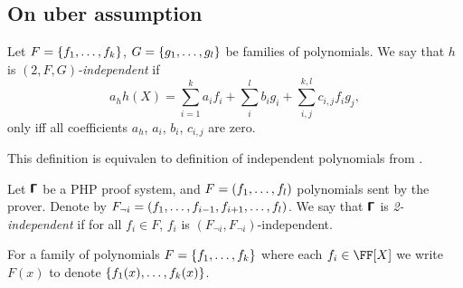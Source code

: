 \documentclass[runningheads,11pt]{llncs}
\begin{document}
\subsection{On uber assumption}


\begin{definition}
  Let $F = \{f_1, \ldots, f_k\}$, $G = \{g_1, \ldots, g_l\}$ be
  families of polynomials. We say that $h$ is \emph{$(2, F, G)$-independent} if
  \[
    a_h h(X) = \sum_{i = 1}^{k} a_{i} f_{i} + \sum_{i}^l b_{i} g_i + \sum_{i, j}^{k, l} c_{i, j}
    f_{i} g_{j},
  \]
  only iff all coefficients $a_h$, $a_{i}$, $b_i$, $c_{i, j}$ are zero. 
\end{definition}
This definition is equivalen to definition of independent polynomials from
\cite{PAIRING:Boyen08}.

\begin{definition}
  Let $\bm{\mathsf{\Gamma}}$ be a PHP proof system, and $F = \left(f_1, \ldots, f_l\right)$
  polynomials sent by the prover. Denote by
  $F_{\neg i} = \left(f_1, \ldots, f_{i - 1}, f_{i + 1}, \ldots, f_l\right)$.  We say
  that $\bm{\mathsf{\Gamma}}$ is \emph{2-independent}  if for all
  $f_i \in F$, $f_i$ is $(F_{\neg i}, F_{\neg i})$-independent.
\end{definition}

For a family of polynomials $F = \{f_1, \ldots, f_k\}$ where each $f_i
\in \FF[X]$ we write $F(x)$ to denote $\{f_1(x), \ldots, f_k(x)\}$. 
\end{document}
